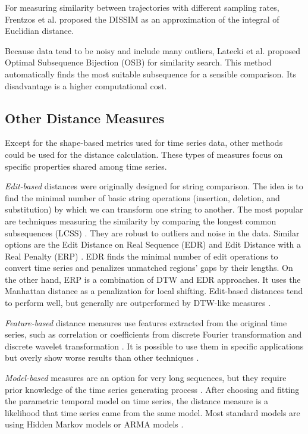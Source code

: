 For measuring similarity between trajectories with different sampling rates, Frentzos et al. \cite{met:dissim} proposed the DISSIM as an approximation of the integral of Euclidian distance. 

Because data tend to be noisy and include many outliers, Latecki et al. \cite{met:osb} proposed Optimal Subsequence Bijection (OSB) for similarity search. This method automatically finds the most suitable subsequence for a sensible comparison. Its disadvantage is a higher computational cost.

\subsection{Other Distance Measures}
Except for the shape-based metrics used for time series data, other methods could be used for the distance calculation. These types of measures focus on specific properties shared among time series.
 
\textit{Edit-based} distances were originally designed for string comparison. The idea is to find the minimal number of basic string operations (insertion, deletion, and substitution) by which we can transform one string to another.  The most popular are techniques measuring the similarity by comparing the longest common subsequences (LCSS) \cite{met:LCSS0, met:LCSS1, met:swale}. They are robust to outliers and noise in the data. Similar options are the Edit Distance on Real Sequence (EDR) \cite{met:edr} and Edit Distance with a Real Penalty (ERP) \cite{met:erp}. EDR finds the minimal number of edit operations to convert time series and penalizes unmatched regions' gaps by their lengths. On the other hand, ERP is a combination of DTW and EDR approaches. It uses the Manhattan distance as a penalization for local shifting. Edit-based distances tend to perform well, but generally are outperformed by DTW-like measures \cite{met:dtw-best-0, met:dtw-best-1}. 

\textit{Feature-based} distance measures use features extracted from the original time series, such as correlation \cite{met:coss-col} or coefficients from discrete Fourier transformation and discrete wavelet transformation \cite{met:dft-dwt}. It is possible to use them in specific applications but overly show worse results than other techniques \cite{met:comparison-new}.

\textit{Model-based} measures are an option for very long sequences, but they require prior knowledge of the time series generating process \cite{met:classification}. After choosing and fitting the parametric temporal model on time series, the distance measure is a likelihood that time series came from the same model. Most standard models are using Hidden Markov models or ARMA models \cite{met:hmm}.

